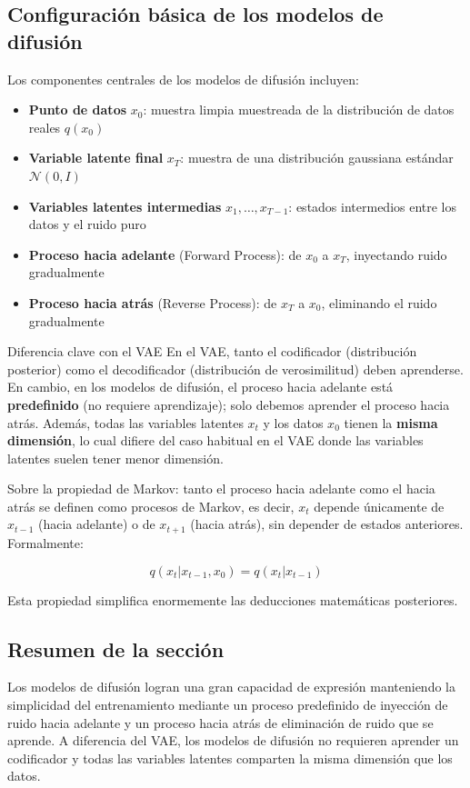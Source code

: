 \subsection{Configuración básica de los modelos de difusión}

Los componentes centrales de los modelos de difusión incluyen:

\begin{itemize}
    \item \textbf{Punto de datos} $x_0$: muestra limpia muestreada de la distribución de datos reales $q(x_0)$
    \item \textbf{Variable latente final} $x_T$: muestra de una distribución gaussiana estándar $\mathcal{N}(0, I)$
    \item \textbf{Variables latentes intermedias} $x_1, \dots, x_{T-1}$: estados intermedios entre los datos y el ruido puro
    \item \textbf{Proceso hacia adelante} (Forward Process): de $x_0$ a $x_T$, inyectando ruido gradualmente
    \item \textbf{Proceso hacia atrás} (Reverse Process): de $x_T$ a $x_0$, eliminando el ruido gradualmente
\end{itemize}

\begin{knowledgebox}{Diferencia clave con el VAE}
En el VAE, tanto el codificador (distribución posterior) como el decodificador (distribución de verosimilitud) deben aprenderse. En cambio, en los modelos de difusión, el proceso hacia adelante está \textbf{predefinido} (no requiere aprendizaje); solo debemos aprender el proceso hacia atrás. Además, todas las variables latentes $x_t$ y los datos $x_0$ tienen la \textbf{misma dimensión}, lo cual difiere del caso habitual en el VAE donde las variables latentes suelen tener menor dimensión.
\end{knowledgebox}

Sobre la propiedad de Markov: tanto el proceso hacia adelante como el hacia atrás se definen como procesos de Markov, es decir, $x_t$ depende únicamente de $x_{t-1}$ (hacia adelante) o de $x_{t+1}$ (hacia atrás), sin depender de estados anteriores. Formalmente:

$$q(x_t | x_{t-1}, x_0) = q(x_t | x_{t-1})$$

Esta propiedad simplifica enormemente las deducciones matemáticas posteriores.

\subsection{Resumen de la sección}

Los modelos de difusión logran una gran capacidad de expresión manteniendo la simplicidad del entrenamiento mediante un proceso predefinido de inyección de ruido hacia adelante y un proceso hacia atrás de eliminación de ruido que se aprende. A diferencia del VAE, los modelos de difusión no requieren aprender un codificador y todas las variables latentes comparten la misma dimensión que los datos.



